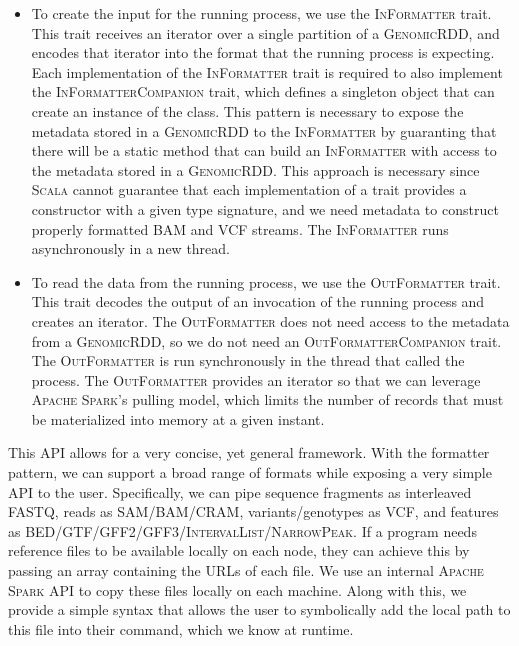 \documentclass[phd]{ucbthesis}
\begin{document}
\begin{itemize}
\item To create the input for the running process, we use the
  \textsc{InFormatter} trait. This trait receives an iterator over a single
  partition of a \textsc{GenomicRDD}, and encodes that iterator into the format
  that the running process is expecting. Each implementation of the
  \textsc{InFormatter} trait is required to also implement the
  \textsc{InFormatterCompanion} trait, which defines a singleton object that
  can create an instance of the class. This pattern is necessary to expose
  the metadata stored in a \textsc{GenomicRDD} to the \textsc{InFormatter} by
  guaranting that there will be a static method that can build an
  \textsc{InFormatter} with access to the metadata stored in a
  \textsc{GenomicRDD}. This approach is necessary since \textsc{Scala} cannot
  guarantee that each implementation of a trait provides a constructor with a
  given type signature, and we need metadata to construct properly formatted
  BAM and VCF streams. The \textsc{InFormatter} runs asynchronously in a new
  thread.
\item To read the data from the running process, we use the
  \textsc{OutFormatter} trait. This trait decodes the output of an invocation of
  the running process and creates an iterator. The \textsc{OutFormatter} does
  not need access to the metadata from a \textsc{GenomicRDD}, so we do not need
  an \textsc{OutFormatterCompanion} trait. The \textsc{OutFormatter} is run
  synchronously in the thread that called the process. The \textsc{OutFormatter}
  provides an iterator so that we can leverage \textsc{Apache Spark}'s pulling
  model, which limits the number of records that must be materialized into
  memory at a given instant.
\end{itemize}

This API allows for a very concise, yet general framework. With the
formatter pattern, we can support a broad range of formats while exposing a
very simple API to the user. Specifically, we can pipe sequence fragments as
interleaved FASTQ, reads as SAM/BAM/CRAM, variants/genotypes as VCF, and
features as BED/GTF/GFF2/GFF3/\-\textsc{IntervalList}/\-\textsc{NarrowPeak}. If
a program needs reference files to be available locally on each node, they can
achieve this by passing an array containing the URLs of each file. We use an
internal \textsc{Apache Spark} API to copy these files locally on each machine.
Along with this, we provide a simple syntax that allows the user to symbolically
add the local path to this file into their command, which we know at runtime.
\end{document}
